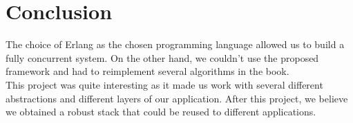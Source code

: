 \documentclass[11pt,english,a4paper]{article}
\begin{document}
\section{Conclusion}
The choice of Erlang as the chosen programming language allowed us to build a fully concurrent system.
On the other hand, we couldn't use the proposed framework and had to reimplement several algorithms in the book.\\

This project was quite interesting as it made us work with several different abstractions and different layers of our application.
After this project, we believe we obtained a robust stack that could be reused to different applications.

\end{document}
